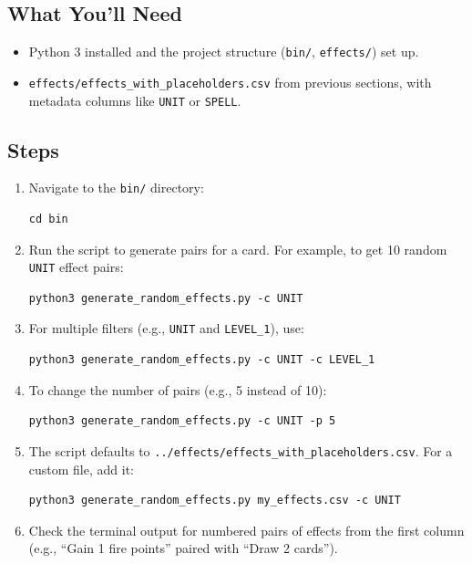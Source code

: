 \subsection{What You’ll Need}
\begin{itemize}
	\item Python 3 installed and the project structure (\texttt{bin/}, \texttt{effects/}) set up.
	\item \texttt{effects/effects\_with\_placeholders.csv} from previous sections, with metadata columns like \texttt{UNIT} or \texttt{SPELL}.
\end{itemize}

\subsection{Steps}
\begin{enumerate}
	\item Navigate to the \texttt{bin/} directory:
\begin{lstlisting}[style=terminalstyle]
cd bin
\end{lstlisting}
	\item Run the script to generate pairs for a card. For example, to get 10 random \texttt{UNIT} effect pairs:
\begin{lstlisting}[style=terminalstyle]
python3 generate_random_effects.py -c UNIT
\end{lstlisting}
	\item For multiple filters (e.g., \texttt{UNIT} and \texttt{LEVEL\_1}), use:
\begin{lstlisting}[style=terminalstyle]
python3 generate_random_effects.py -c UNIT -c LEVEL_1
\end{lstlisting}
	\item To change the number of pairs (e.g., 5 instead of 10):
\begin{lstlisting}[style=terminalstyle]
python3 generate_random_effects.py -c UNIT -p 5
\end{lstlisting}
	\item The script defaults to \texttt{../effects/effects\_with\_placeholders.csv}. For a custom file, add it:
\begin{lstlisting}[style=terminalstyle]
python3 generate_random_effects.py my_effects.csv -c UNIT
\end{lstlisting}
	\item Check the terminal output for numbered pairs of effects from the first column (e.g., ``Gain 1 fire points'' paired with ``Draw 2 cards'').
\end{enumerate}

